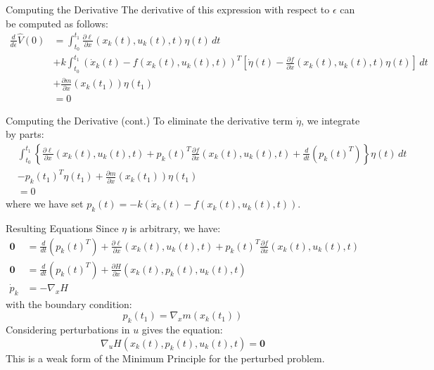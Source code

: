 \documentclass[10pt]{beamer}
\begin{document}
\begin{frame}[fragile]{Computing the Derivative}
  The derivative of this expression with respect to \( \epsilon \) can be computed as follows:
  \[
    \begin{aligned}
      \frac{d}{d\epsilon} \hat{V}(0) &= \int_{t_0}^{t_1} \frac{\partial \ell}{\partial x} (x_k(t), u_k(t), t) \eta(t) \, dt \\
      &+ k \int_{t_0}^{t_1} (\dot{x}_k(t) - f(x_k(t), u_k(t), t))^T [\dot{\eta}(t) - \frac{\partial f}{\partial x} (x_k(t), u_k(t), t) \eta(t)] \, dt \\
      &+ \frac{\partial m}{\partial x} (x_k(t_1)) \eta(t_1) \\
      & = 0
    \end{aligned}
  \]
\end{frame}
  
\begin{frame}[fragile]{Computing the Derivative (cont.)}
  To eliminate the derivative term \( \dot{\eta} \), we integrate by parts:
  \[
  \begin{aligned}
    &\int_{t_0}^{t_1} \left\{ \frac{\partial \ell}{\partial x} (x_k(t), u_k(t), t) + p_k(t)^T \frac{\partial f}{\partial x} (x_k(t), u_k(t), t) + \frac{d}{dt} \left( p_k(t)^T \right) \right\} \eta(t) \, dt \\
    &- p_k(t_1)^T \eta(t_1) + \frac{\partial m}{\partial x} (x_k(t_1)) \eta(t_1) \\
    & = 0
  \end{aligned}
  \]
  where we have set \( p_k(t) = -k (\dot{x}_k(t) - f(x_k(t), u_k(t), t)) \).
\end{frame}

\begin{frame}[fragile]{Resulting Equations}
  Since \( \eta \) is arbitrary, we have:
  \[
    \begin{aligned}
      \mathbf{0} &= \frac{d}{dt} \left( p_k(t)^T \right) + \frac{\partial \ell}{\partial x} (x_k(t), u_k(t), t) + p_k(t)^T \frac{\partial f}{\partial x} (x_k(t), u_k(t), t) \\
      \mathbf{0} &= \frac{d}{dt} \left( p_k(t)^T \right) + \frac{\partial H}{\partial x} (x_k(t), p_k(t), u_k(t), t) \\
      \dot{p}_{k} &= -\nabla_x H
    \end{aligned}
  \]
  with the boundary condition:
  \[
    p_k(t_1) = \nabla_x m(x_k(t_1))
  \]
  Considering perturbations in \( u \) gives the equation:
  \[
    \nabla_u H (x_k(t), p_k(t), u_k(t), t) = \mathbf{0}
  \]
  This is a weak form of the Minimum Principle for the perturbed problem.
\end{frame}
\end{document}
